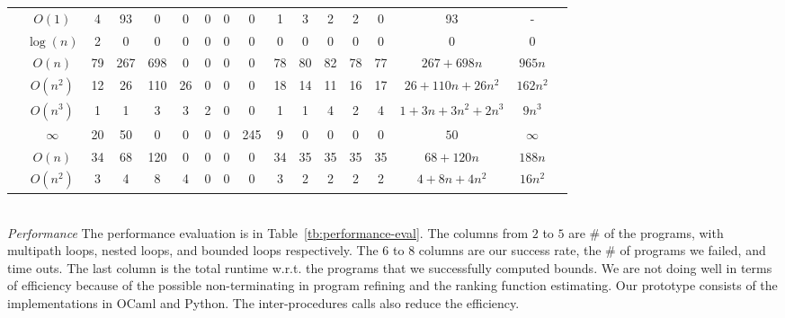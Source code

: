 \begin{table}[ht]
{\begin{tabular}{ >{\scriptsize}c | >{\scriptsize}c | >{\scriptsize}c | >{\scriptsize}c | c | c | c | c | c | c | c | c | c | c | c | c | c |}
 \hline \hline
 \multirow{6}{*}{Icra} 
 & $O(1)$ & 4 & 93 & 0 & 0 & 0 & 0 & 0 & 1 & 3 & 2 & 2 & 0 & 93 & - \\
 \cline{2-2}
 & $\log(n)$ & 2 & 0 & 0 & 0 & 0 & 0 & 0 & 0 & 0 & 0 & 0 & 0 & 0 & 0 \\
 \cline{2-2}
 & $O(n)$ & 79 & 267 & 698 & 0 & 0 & 0 & 0 & 78 & 80 & 82 & 78 & 77 & $267 + 698n$ & $ 965n $\\
 \cline{2-2}
 & $O(n^2)$ & 12 & 26 & 110 & 26 & 0 & 0 & 0 & 18 & 14 & 11 & 16 & 17 & $26+110n+26n^2$ & $162n^2$\\
 \cline{2-2}
 & $O(n^3)$ & 1 & 1 & 3 & 3 & 2 & 0 & 0 & 1 & 1 & 4 & 2 & 4 & $1+3n+3n^2+2n^3$ & $9n^3$\\
 \cline{2-2}
 & $\infty$ & 20 &  50 & 0 & 0 & 0 & 0 & 245 & 9 & 0 & 0 & 0 & 0 & $50$ & $ \infty$\\
 \hline \hline
 \multirow{2}{*}{Tianhan} 
 & $O(n)$ & 34 & 68 & 120 & 0 & 0 & 0 & 0 & 34 & 35 & 35 & 35 & 35 & $68+120n$ & $188n$\\
 \cline{2-2}
 & $O(n^2)$ & 3 & 4 & 8 & 4 & 0 & 0 & 0 & 3 & 2 & 2 & 2 & 2 & $4+8n+4n^2$ & $16n^2$ \\
 \hline
 \end{tabular}
 }
 \vspace{-0.8cm}
 \end{table}
%
\\
\emph{Performance}
The performance evaluation is in Table~\ref{tb:performance-eval}.
The columns from $2$ to $5$ are $\# $ of the programs, with multipath loops, nested loops, and bounded loops respectively.
The $6$ to $8$ columns are our success rate, the \# of programs we failed, and time outs. The last column is the total runtime w.r.t. the programs that we successfully computed bounds.
We are not doing well in terms of efficiency because of the possible non-terminating in program refining and the ranking function estimating.
Our prototype consists of the implementations in OCaml and Python.
The inter-procedures calls also reduce the efficiency.
%
%
